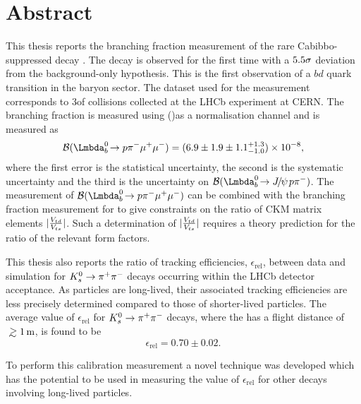 \chapter*{Abstract}
\noindent
This thesis reports the branching fraction measurement of the rare Cabibbo-suppressed decay \Lbpi. The decay is observed for the first time with a $5.5\sigma$ deviation from the background-only hypothesis. This is the first observation of a $b$\to$d$ quark transition in the baryon sector. The dataset used for the measurement corresponds to 3\:\invfb of \proton{}\proton collisions collected at the LHCb experiment at CERN. The branching fraction is measured using \Lb\to\jpsi(\to\mumu)\proton\pim as a normalisation channel and is measured as
\begin{equation*}
  \BF(\Lbpi) = \BFV,
\end{equation*}
where the first error is the statistical uncertainty, the second is the systematic uncertainty and the third is the uncertainty on $\BF(\Lbpijpsi)$.
The measurement of $\BF(\Lbpi)$ can be combined with the branching fraction measurement for \LbK to give constraints on the ratio of CKM matrix elements $|\frac{{V_{{t}{d}}}}{{V_{{t}{s}}}}|$. Such a determination of $|\frac{{V_{{t}{d}}}}{{V_{{t}{s}}}}|$  requires a theory prediction for the ratio of the relevant form factors.

This thesis also reports the ratio of tracking efficiencies, $\epsilon_{\mathrm{rel}}$, between data and simulation for ${{K}^0_{s}}\rightarrow{\ensuremath{{\pi}^+}}{\ensuremath{{\pi}^-}}$ decays occurring within the LHCb detector acceptance. As \KS particles are long-lived, their associated tracking efficiencies are less precisely determined compared to those of shorter-lived particles. The average value of $\epsilon_{\mathrm{rel}}$ for ${{K}^0_{s}}\rightarrow{\ensuremath{{\pi}^+}}{\ensuremath{{\pi}^-}}$ decays, where the \KS has a flight distance of $\gsim 1\m$, is found to be
\begin{equation*}
  \epsilon_{\mathrm{rel}} = 0.70\pm0.02.
\end{equation*}

 To perform this calibration measurement a novel technique was developed which has the potential to be used in measuring the value of $\epsilon_{\mathrm{rel}}$ for other decays involving long-lived particles.


